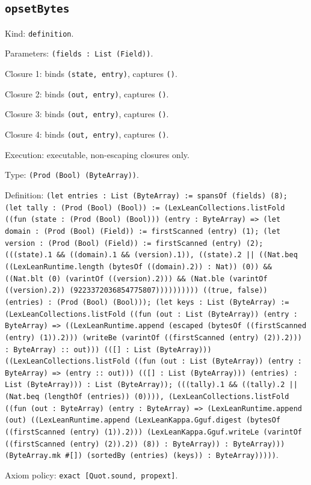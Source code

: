 \documentclass[11pt]{article}
\begin{document}
\subsection*{\texttt{opsetBytes}}
\noindent Kind: \texttt{definition}.\par
\noindent Parameters: \texttt{(fields : List (Field))}.\par
\noindent Closure 1: binds \texttt{(state, entry)}, captures \texttt{()}.\par
\noindent Closure 2: binds \texttt{(out, entry)}, captures \texttt{()}.\par
\noindent Closure 3: binds \texttt{(out, entry)}, captures \texttt{()}.\par
\noindent Closure 4: binds \texttt{(out, entry)}, captures \texttt{()}.\par
\noindent Execution: executable, non-escaping closures only.\par
\noindent Type: \texttt{(Prod (Bool) (ByteArray))}.\par
\noindent Definition: \texttt{(let entries : List (ByteArray) := spansOf (fields) (8); (let tally : (Prod (Bool) (Bool)) := (LexLeanCollections.listFold ((fun (state : (Prod (Bool) (Bool))) (entry : ByteArray) => (let domain : (Prod (Bool) (Field)) := firstScanned (entry) (1); (let version : (Prod (Bool) (Field)) := firstScanned (entry) (2); (((state).1 \&\& ((domain).1 \&\& (version).1)), ((state).2 || ((Nat.beq ((LexLeanRuntime.length (bytesOf ((domain).2)) : Nat)) (0)) \&\& ((Nat.blt (0) (varintOf ((version).2))) \&\& (Nat.ble (varintOf ((version).2)) (9223372036854775807)))))))))) ((true, false)) (entries) : (Prod (Bool) (Bool))); (let keys : List (ByteArray) := (LexLeanCollections.listFold ((fun (out : List (ByteArray)) (entry : ByteArray) => ((LexLeanRuntime.append (escaped (bytesOf ((firstScanned (entry) (1)).2))) (writeBe (varintOf ((firstScanned (entry) (2)).2))) : ByteArray) :: out))) (([] : List (ByteArray))) ((LexLeanCollections.listFold ((fun (out : List (ByteArray)) (entry : ByteArray) => (entry :: out))) (([] : List (ByteArray))) (entries) : List (ByteArray))) : List (ByteArray)); (((tally).1 \&\& ((tally).2 || (Nat.beq (lengthOf (entries)) (0)))), (LexLeanCollections.listFold ((fun (out : ByteArray) (entry : ByteArray) => (LexLeanRuntime.append (out) ((LexLeanRuntime.append (LexLeanKappa.Gguf.digest (bytesOf ((firstScanned (entry) (1)).2))) (LexLeanKappa.Gguf.writeLe (varintOf ((firstScanned (entry) (2)).2)) (8)) : ByteArray)) : ByteArray))) (ByteArray.mk \#[]) (sortedBy (entries) (keys)) : ByteArray)))))}.\par
\noindent Axiom policy: \texttt{exact [Quot.sound, propext]}.\par
\end{document}
